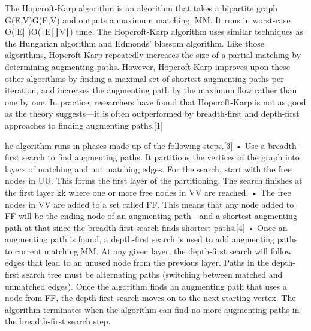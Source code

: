 \begin{definition}

The Hopcroft-Karp algorithm is an algorithm that takes a bipartite graph G(E,V)G(E,V) and outputs a maximum matching, MM. It runs in worst-case O\big(|E| \big)O(∣E∣∣V∣) time.
The Hopcroft-Karp algorithm uses similar techniques as the Hungarian algorithm and Edmonds’ blossom algorithm. Like those algorithms, Hopcroft-Karp repeatedly increases the size of a partial matching by determining augmenting paths. However, Hopcroft-Karp improves upon these other algorithms by finding a maximal set of shortest augmenting paths per iteration, and increases the augmenting path by the maximum flow rather than one by one.
In practice, researchers have found that Hopcroft-Karp is not as good as the theory suggests—it is often outperformed by breadth-first and depth-first approaches to finding augmenting paths.[1]

he algorithm runs in phases made up of the following steps.[3]
•	Use a breadth-first search to find augmenting paths. It partitions the vertices of the graph into layers of matching and not matching edges. For the search, start with the free nodes in UU. This forms the first layer of the partitioning. The search finishes at the first layer kk where one or more free nodes in VV are reached.
•	The free nodes in VV are added to a set called FF. This means that any node added to FF will be the ending node of an augmenting path—and a shortest augmenting path at that since the breadth-first search finds shortest paths.[4]
•	Once an augmenting path is found, a depth-first search is used to add augmenting paths to current matching MM. At any given layer, the depth-first search will follow edges that lead to an unused node from the previous layer. Paths in the depth-first search tree must be alternating paths (switching between matched and unmatched edges). Once the algorithm finds an augmenting path that uses a node from FF, the depth-first search moves on to the next starting vertex.
The algorithm terminates when the algorithm can find no more augmenting paths in the breadth-first search step.


\end{definition}
